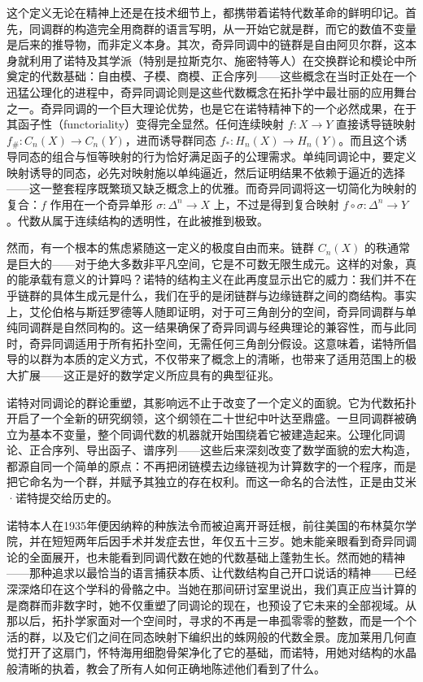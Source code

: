\documentclass[12pt,a4paper]{article}
\begin{document}
这个定义无论在精神上还是在技术细节上，都携带着诺特代数革命的鲜明印记。首先，同调群的构造完全用商群的语言写明，从一开始它就是群，而它的数值不变量是后来的推导物，而非定义本身。其次，奇异同调中的链群是自由阿贝尔群，这本身就利用了诺特及其学派（特别是拉斯克尔、施密特等人）在交换群论和模论中所奠定的代数基础：自由模、子模、商模、正合序列——这些概念在当时正处在一个迅猛公理化的进程中，奇异同调论则是这些代数概念在拓扑学中最壮丽的应用舞台之一。奇异同调的一个巨大理论优势，也是它在诺特精神下的一个必然成果，在于其函子性（functoriality）变得完全显然。任何连续映射 $f: X \to Y$ 直接诱导链映射 $f_\#: C_n(X) \to C_n(Y)$，进而诱导群同态 $f_*: H_n(X) \to H_n(Y)$。而且这个诱导同态的组合与恒等映射的行为恰好满足函子的公理需求。单纯同调论中，要定义映射诱导的同态，必先对映射施以单纯逼近，然后证明结果不依赖于逼近的选择——这一整套程序既繁琐又缺乏概念上的优雅。而奇异同调将这一切简化为映射的复合：$f$ 作用在一个奇异单形 $\sigma: \Delta^n \to X$ 上，不过是得到复合映射 $f \circ \sigma: \Delta^n \to Y$。代数从属于连续结构的透明性，在此被推到极致。

然而，有一个根本的焦虑紧随这一定义的极度自由而来。链群 $C_n(X)$ 的秩通常是巨大的——对于绝大多数非平凡空间，它是不可数无限生成元。这样的对象，真的能承载有意义的计算吗？诺特的结构主义在此再度显示出它的威力：我们并不在乎链群的具体生成元是什么，我们在乎的是闭链群与边缘链群之间的商结构。事实上，艾伦伯格与斯廷罗德等人随即证明，对于可三角剖分的空间，奇异同调群与单纯同调群是自然同构的。这一结果确保了奇异同调与经典理论的兼容性，而与此同时，奇异同调适用于所有拓扑空间，无需任何三角剖分假设。这意味着，诺特所倡导的以群为本质的定义方式，不仅带来了概念上的清晰，也带来了适用范围上的极大扩展——这正是好的数学定义所应具有的典型征兆。

诺特对同调论的群论重塑，其影响远不止于改变了一个定义的面貌。它为代数拓扑开启了一个全新的研究纲领，这个纲领在二十世纪中叶达至鼎盛。一旦同调群被确立为基本不变量，整个同调代数的机器就开始围绕着它被建造起来。公理化同调论、正合序列、导出函子、谱序列——这些后来深刻改变了数学面貌的宏大构造，都源自同一个简单的原点：不再把闭链模去边缘链视为计算数字的一个程序，而是把它命名为一个群，并赋予其独立的存在权利。而这一命名的合法性，正是由艾米·诺特提交给历史的。

诺特本人在1935年便因纳粹的种族法令而被迫离开哥廷根，前往美国的布林莫尔学院，并在短短两年后因手术并发症去世，年仅五十三岁。她未能亲眼看到奇异同调论的全面展开，也未能看到同调代数在她的代数基础上蓬勃生长。然而她的精神——那种追求以最恰当的语言捕获本质、让代数结构自己开口说话的精神——已经深深烙印在这个学科的骨骼之中。当她在那间研讨室里说出，我们真正应当计算的是商群而非数字时，她不仅重塑了同调论的现在，也预设了它未来的全部视域。从那以后，拓扑学家面对一个空间时，寻求的不再是一串孤零零的整数，而是一个个活的群，以及它们之间在同态映射下编织出的蛛网般的代数全景。庞加莱用几何直觉打开了这扇门，怀特海用细胞骨架净化了它的基础，而诺特，用她对结构的水晶般清晰的执着，教会了所有人如何正确地陈述他们看到了什么。
\end{document}
